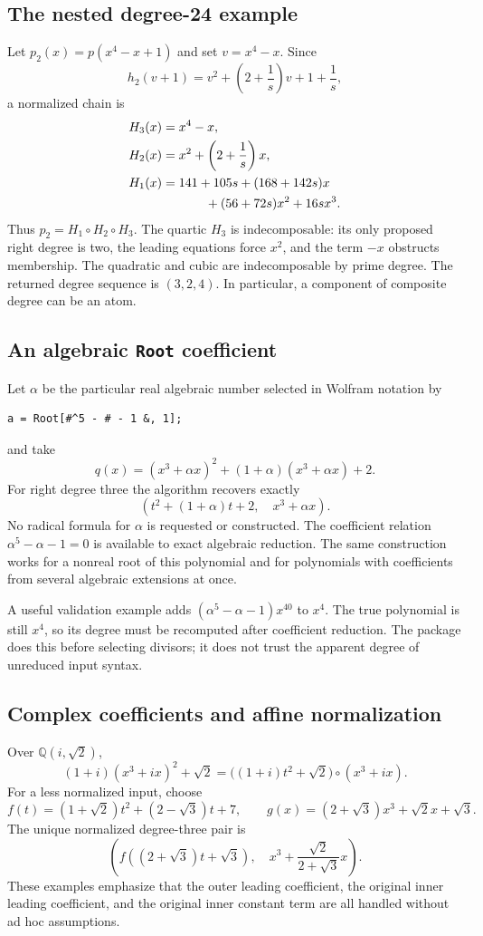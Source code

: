 \documentclass[11pt,a4paper]{article}
\numberwithin{equation}{section}
\theoremstyle{definition}
\theoremstyle{remark}
\newcommand{\Q}{\mathbb{Q}}
\newcommand{\code}[1]{\texttt{#1}}
\begin{document}
\subsection{The nested degree-24 example}
Let $p_2(x)=p(x^4-x+1)$ and set $v=x^4-x$. Since
\[
 h_2(v+1)=v^2+\left(2+\frac1s\right)v+1+\frac1s,
\]
a normalized chain is
\begin{align*}
 H_3(x)&=x^4-x,\\
 H_2(x)&=x^2+\left(2+\frac1s\right)x,\\
 H_1(x)&=141+105s+(168+142s)x\\
       &\hspace{12mm}+(56+72s)x^2+16s x^3.
\end{align*}
Thus $p_2=H_1\circ H_2\circ H_3$. The quartic $H_3$ is indecomposable: its
only proposed right degree is two, the leading equations force $x^2$, and
the term $-x$ obstructs membership. The quadratic and cubic are
indecomposable by prime degree. The returned degree sequence is $(3,2,4)$.
In particular, a component of composite degree can be an atom.

\subsection{An algebraic \code{Root} coefficient}
Let $\alpha$ be the particular real algebraic number selected in Wolfram
notation by
\begin{lstlisting}
a = Root[#^5 - # - 1 &, 1];
\end{lstlisting}
and take
\[
 q(x)=(x^3+\alpha x)^2+(1+\alpha)(x^3+\alpha x)+2.
\]
For right degree three the algorithm recovers exactly
\[
 (t^2+(1+\alpha)t+2,\quad x^3+\alpha x).
\]
No radical formula for $\alpha$ is requested or constructed. The coefficient
relation $\alpha^5-\alpha-1=0$ is available to exact algebraic reduction.
The same construction works for a nonreal root of this polynomial and for
polynomials with coefficients from several algebraic extensions at once.

A useful validation example adds $(\alpha^5-\alpha-1)x^{40}$ to $x^4$.
The true polynomial is still $x^4$, so its degree must be recomputed after
coefficient reduction. The package does this before selecting divisors; it
does not trust the apparent degree of unreduced input syntax.

\subsection{Complex coefficients and affine normalization}
Over $\Q(i,\sqrt2)$,
\[
 (1+i)(x^3+ix)^2+\sqrt2
 =\bigl((1+i)t^2+\sqrt2\bigr)\circ(x^3+ix).
\]
For a less normalized input, choose
\[
 f(t)=(1+\sqrt2)t^2+(2-\sqrt3)t+7,\qquad
 g(x)=(2+\sqrt3)x^3+\sqrt2 x+\sqrt3.
\]
The unique normalized degree-three pair is
\[
 \left(f((2+\sqrt3)t+\sqrt3),\quad
           x^3+\frac{\sqrt2}{2+\sqrt3}x\right).
\]
These examples emphasize that the outer leading coefficient, the original
inner leading coefficient, and the original inner constant term are all
handled without ad hoc assumptions.
\end{document}
